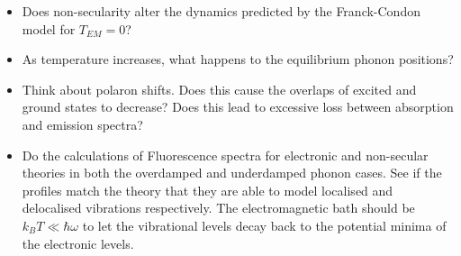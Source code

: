 \documentclass[]{article}
\begin{document}
\begin{itemize}
	\item Does non-secularity alter the dynamics predicted by the Franck-Condon model for $T_{EM}=0$?
	\item As temperature increases, what happens to the equilibrium phonon positions?
	\item Think about polaron shifts. Does this cause the overlaps of excited and ground states to decrease? Does this lead to excessive loss between absorption and emission spectra?
	\item Do the calculations of Fluorescence spectra for electronic and non-secular theories in both the overdamped and underdamped phonon cases. See if the profiles match the theory that they are able to model localised and delocalised vibrations respectively. The electromagnetic bath should be $k_B T\ll \hbar\omega$ to let the vibrational levels decay back to the potential minima of the electronic levels.
\end{itemize}




\end{document}
